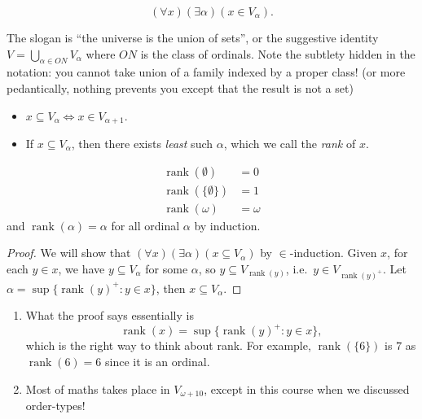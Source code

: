 \documentclass[a4paper]{article}
\DeclareMathOperator{\rank}{rank}
\begin{document}
\begin{theorem}
  \[
    (\forall x) (\exists \alpha) (x \in V_\alpha).
  \]
\end{theorem}

The slogan is ``the universe is the union of sets'', or the suggestive identity \(V = \bigcup_{\alpha \in ON} V_\alpha\) where \(ON\) is the class of ordinals. Note the subtlety hidden in the notation: you cannot take union of a family indexed by a proper class! (or more pedantically, nothing prevents you except that the result is not a set)

\begin{note}\leavevmode
  \begin{itemize}
  \item \(x \subseteq V_\alpha \iff x \in V_{\alpha + 1}\).
  \item If \(x \subseteq V_\alpha\), then there exists \emph{least} such \(\alpha\), which we call the \emph{rank} of \(x\).
  \end{itemize}
\end{note}

\begin{eg}
  \begin{align*}
    \rank(\emptyset) &= 0 \\
    \rank(\{\emptyset\}) &= 1 \\
    \rank(\omega) &= \omega
  \end{align*}
  and \(\rank(\alpha) = \alpha\) for all ordinal \(\alpha\) by induction.
\end{eg}

\begin{proof}
  We will show that \((\forall x) (\exists \alpha) (x \subseteq V_\alpha)\) by \(\in\)-induction. Given \(x\), for each \(y \in x\), we have \(y \subseteq V_\alpha\) for some \(\alpha\), so \(y \subseteq V_{\rank(y)}\), i.e.\ \(y \in V_{\rank(y)^+}\). 
  Let \(\alpha = \sup\{\rank(y)^+: y \in x\}\), then \(x \subseteq V_\alpha\).
\end{proof}

\begin{remark}\leavevmode
  \begin{enumerate}
  \item What the proof says essentially is
    \[
      \rank(x) = \sup\{\rank(y)^+: y \in x\},
    \]
    which is the right way to think about rank. For example, \(\rank(\{6\})\) is \(7\) as \(\rank(6) = 6\) since it is an ordinal.
  \item Most of maths takes place in \(V_{\omega + 10}\), except in this course when we discussed order-types!
  \end{enumerate}
\end{remark}
\end{document}
